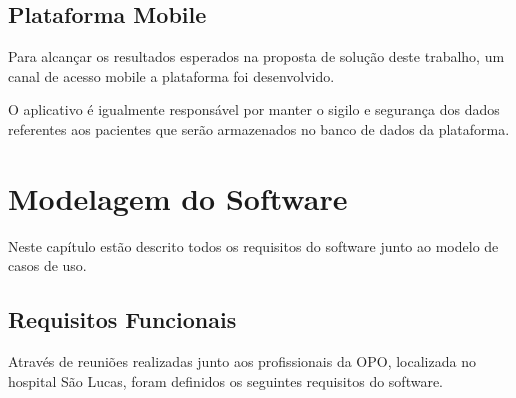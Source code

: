\documentclass[portuguese,oneside]{tcc}
\begin{document}
\section{Plataforma Mobile}

Para alcançar os resultados esperados na proposta de solução deste trabalho, um canal de acesso mobile a plataforma foi desenvolvido.
 

O aplicativo é igualmente responsável por manter o sigilo e segurança dos dados referentes aos pacientes que serão armazenados no banco de dados da plataforma.

\chapter{Modelagem do Software}
Neste capítulo estão descrito todos os requisitos do software junto ao modelo de casos de uso.

\section{Requisitos Funcionais}
Através de reuniões realizadas junto aos profissionais da OPO, localizada no hospital São Lucas, foram definidos os seguintes requisitos do software.
\end{document}
